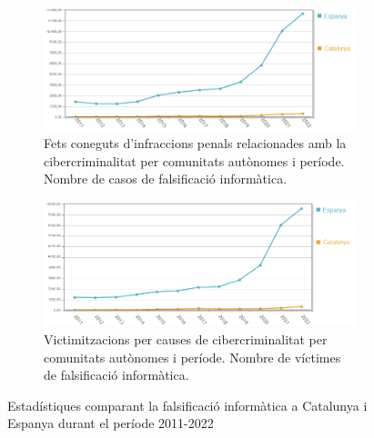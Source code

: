 \begin{figure}[H]
    \centering
    \begin{subfigure}[b]{0.8\textwidth}
      \includegraphics[width=\linewidth]{falsificacio.png}
      \caption{Fets coneguts d'infraccions penals relacionades amb la cibercriminalitat per comunitats autònomes i període. Nombre de casos de falsificació informàtica.}
      \label{fig:falsificacio}
    \end{subfigure}
  
    \vspace{1em} %
  
    \begin{subfigure}[b]{0.8\textwidth}
      \includegraphics[width=\linewidth]{victimes_falsificacio.png}
      \caption{Victimitzacions per causes de cibercriminalitat per comunitats autònomes i període. Nombre de víctimes de falsificació informàtica.}
      \label{fig:victimes_falsificacio}
    \end{subfigure}
    
    \caption{Estadístiques comparant la falsificació informàtica a Catalunya i Espanya durant el període 2011-2022}
    \label{fig:falsificacio_2}
\end{figure}

